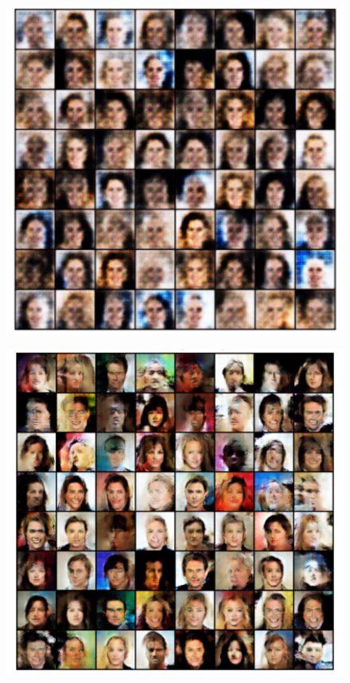 \documentclass[12pt]{article}
\begin{document}
\begin{figure}[h]
    \centering
    \begin{minipage}{0.45\textwidth}
        \centering
        \includegraphics[width=\textwidth]{7.png} 
        \label{fig:resim1}
    \end{minipage}\hfill
    \begin{minipage}{0.45\textwidth}
        \centering
        \includegraphics[width=\textwidth]{8.png}
        \label{fig:resim2}
    \end{minipage}
\end{figure}
\end{document}
